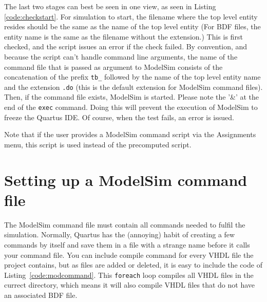 \documentclass[11pt,a4paper,final,oneside,titlepage,fleqn]{article}
\begin{document}


The last two stages can best be seen in one view, as seen in Listing~%
\ref{code:checkstart}. For simulation to start, the filename where the top
level entity resides should be the same as the name of the top level
entity (For BDF files, the entity name is the same as the filename without
the extension.) This is first checked, and the script issues an error if
the check failed. By convention, and because the script
can't handle command line arguments, the name of the command file that is
passed as argument to ModelSim consists of the concatenation of the prefix
\texttt{tb\_} followed by the name of the top level entity name and the extension
\texttt{.do} (this is the default extension for ModelSim command files).
Then, if the command file exists, ModelSim is started. Please
note the '\&' at the end of the \texttt{exec} command. Doing this will prevent
the execution of ModelSim to freeze the Quartus IDE. Of course, when the
test fails, an error is issued.



Note that if the user provides a ModelSim command script via the Assignments menu,
this script is used instead of the precomputed script.
 

\section{Setting up a ModelSim command file}
\label{sec:modelsimcommandfile}
The ModelSim command file must contain all commands needed to fulfil the simulation.
Normally, Quartus has the (annoying) habit of creating a few commands by itself
and save them in a file with a strange name before it calls your command file.
You can include compile command for every VHDL file the project
contains, but as files are added or deleted, it is easy to include the code of
Listing~\ref{code:modcommand}. This \texttt{foreach} loop compiles all VHDL
files in the currect directory, which means it will also compile VHDL files
that do not have an associated BDF file.
\end{document}
